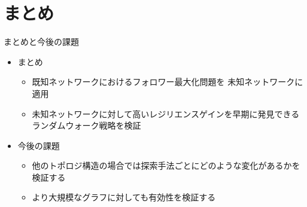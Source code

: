 \documentclass[compress,dvipdfmx,11pt]{beamer}
\begin{document}
\section{まとめ}
\label{sec:org4b3d7d5}
\begin{frame}[label={sec:orgeadf93c}]{まとめと今後の課題}
\begin{itemize}
\item まとめ
\begin{itemize}
\item 既知ネットワークにおけるフォロワー最大化問題を \alert{未知ネットワークに適用}
\item 未知ネットワークに対して高いレジリエンスゲインを早期に発見できるランダムウォーク戦略を検証
\end{itemize}

\item 今後の課題
\begin{itemize}
\item 他のトポロジ構造の場合では探索手法ごとにどのような変化があるかを検証する
\item より大規模なグラフに対しても有効性を検証する
\end{itemize}
\end{itemize}
\end{frame}
\end{document}
